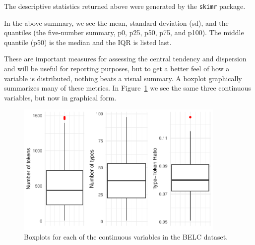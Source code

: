 \documentclass[
  letterpaper,
]{latex/krantz}
\begin{document}
\begin{tcolorbox}[enhanced jigsaw, toprule=.15mm, bottomtitle=1mm, coltitle=black, title=\textcolor{quarto-callout-warning-color}{\faExclamationTriangle}\hspace{0.5em}{Tip}, left=2mm, colframe=quarto-callout-warning-color-frame, bottomrule=.15mm, colbacktitle=quarto-callout-warning-color!10!white, leftrule=.75mm, colback=white, titlerule=0mm, breakable, toptitle=1mm, opacityback=0, arc=.35mm, rightrule=.15mm, opacitybacktitle=0.6]

The descriptive statistics returned above were generated by the
\texttt{skimr} package.

\end{tcolorbox}

In the above summary, we see the mean, standard deviation (sd), and the
quantiles (the five-number summary, p0, p25, p50, p75, and p100). The
middle quantile (p50) is the median and the IQR is listed last.

These are important measures for assessing the central tendency and
dispersion and will be useful for reporting purposes, but to get a
better feel of how a variable is distributed, nothing beats a visual
summary. A boxplot graphically summarizes many of these metrics. In
Figure~\ref{fig-summaries-boxplots-belc} we see the same three
continuous variables, but now in graphical form.

\begin{figure}[h]

{\centering \includegraphics[width=0.9\textwidth,height=\textheight]{./approaching-analysis_files/figure-pdf/fig-summaries-boxplots-belc-1.pdf}

}

\caption{\label{fig-summaries-boxplots-belc}Boxplots for each of the
continuous variables in the BELC dataset.}

\end{figure}
\end{document}
